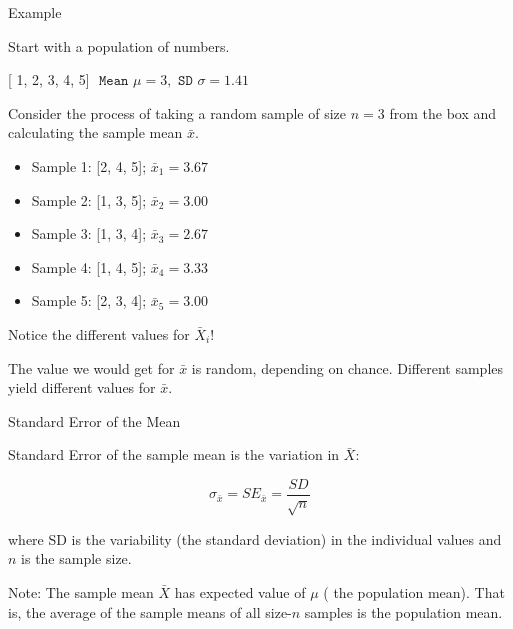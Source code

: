\documentclass[14pt]{beamer}\usepackage[]{graphicx}\usepackage[]{color}
\begin{document}
\begin{frame}[fragile]{Example}

{\small{
Start with a population of numbers.

[ 1, 2, 3, 4, 5]  $\texttt{ Mean } \mu = 3, \texttt{ SD } \sigma = 1.41$

Consider the process of taking a random sample of size $n = 3$  from the box and calculating the sample mean $\bar{x}$. 

{\footnotesize{
\begin{itemize}
\item Sample 1: [2, 4, 5];  $\bar{x}_1 = 3.67$
\item Sample 2: [1, 3, 5];  $\bar{x}_2 = 3.00$
\item Sample 3: [1, 3, 4];  $\bar{x}_3 = 2.67$
\item Sample 4: [1, 4, 5];  $\bar{x}_4 = 3.33$
\item Sample 5: [2, 3, 4];  $\bar{x}_5 = 3.00$
\end{itemize}
}}

Notice the different values for $\bar{X}_i$!

The value we would get for $\bar{x}$ is random, depending on chance.  Different samples yield different values for $\bar{x}$. 
}}
\end{frame}

\begin{frame}[fragile]{Standard Error of the Mean}

Standard Error of the sample mean is the variation in $\bar{X}$:

\begin{equation*}
  \sigma_{\bar{x}} = SE_{\bar{x}} = \frac{SD}{\sqrt{n}}
\end{equation*}

where SD is the variability (the standard deviation) in the individual  values and $n$ is the sample size.

\vspace{3mm}

Note: The sample mean $\bar{X}$ has expected value of $\mu$ ( the population  mean). That is, the average of the sample means of all size-$n$ samples  is the population mean.

\end{frame}
\end{document}
